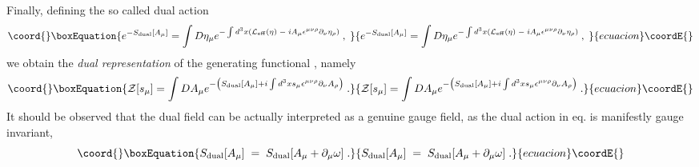 \documentclass[a4paper,12pt]{article}
\begin{document}
Finally, defining the so called dual action \coordHE{}
\begin{equation}\coord{}\boxEquation{
  \label{dual-act}
e^{-S_{{\rm dual}}[A_\mu]}=\int D\eta _\mu e^{-\int d^3x\left( {\cal L}_{{\rm eff
}}(\eta )\;-\;iA_\mu \epsilon^{\mu \nu \rho }\partial _\nu \eta _\rho
\right) \;},\;
}{
  e^{-S_{{\rm dual}}[A_\mu]}=\int D\eta _\mu e^{-\int d^3x\left( {\cal L}_{{\rm eff
}}(\eta )\;-\;iA_\mu \epsilon^{\mu \nu \rho }\partial _\nu \eta _\rho
\right) \;},\;
}{ecuacion}\coordE{}\end{equation}
we obtain the {\it dual representation\/} of the generating functional
\coordHE{}, namely
\begin{equation}\coord{}\boxEquation{
 \label{g-ff}
{\cal Z}[s_\mu]=\int DA_\mu e^{-\left( S_{{\rm dual}}[A_\mu]+i \int d^3xs_\mu
\epsilon ^{\mu \nu \rho }\partial _\nu A_\rho \right) \;}.
}{
 {\cal Z}[s_\mu]=\int DA_\mu e^{-\left( S_{{\rm dual}}[A_\mu]+i \int d^3xs_\mu
\epsilon ^{\mu \nu \rho }\partial _\nu A_\rho \right) \;}.
}{ecuacion}\coordE{}\end{equation}
It should be observed that the dual field \coordHE{} can be actually
interpreted as a genuine gauge field, as the dual action \coordHE{} in eq.\myHighlight{$\left( {\rm {\ref{dual-act}}}\right) $}\coordHE{} is
manifestly gauge invariant,
\begin{equation}\coord{}\boxEquation{
S_{{\rm dual}}[A_\mu ]\;=\;S_{{\rm dual}}[A_\mu +\partial _\mu \omega ]\;.
\label{gin}
}{
S_{{\rm dual}}[A_\mu ]\;=\;S_{{\rm dual}}[A_\mu +\partial _\mu \omega ]\;.
}{ecuacion}\coordE{}\end{equation}
\end{document}
